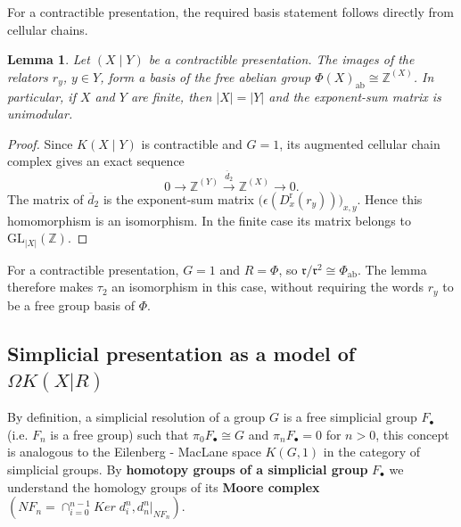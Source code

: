 \documentclass[11pt,a4paper]{article}
\newtheorem{lemma}[theorem]{Lemma}
\begin{document}
For a contractible presentation, the required basis statement follows
directly from cellular chains.
\begin{lemma}\label{l.1.3}
Let $(X\mid Y)$ be a contractible presentation.  The images of the relators
$r_y$, $y\in Y$, form a basis of the free abelian group
$\Phi(X)_{\mathrm{ab}}\cong\mathbb Z^{(X)}$.  In particular, if $X$ and $Y$
are finite, then $|X|=|Y|$ and the exponent-sum matrix is unimodular.
\end{lemma}
\begin{proof}
Since $K(X\mid Y)$ is contractible and $G=1$, its augmented cellular chain
complex gives an exact sequence
\[
 0\longrightarrow\mathbb Z^{(Y)}\xrightarrow{\,\overline d_2\,}
 \mathbb Z^{(X)}\longrightarrow0.
\]
The matrix of $\overline d_2$ is the exponent-sum matrix
$\bigl(\epsilon(D_x^{\mathrm r}(r_y))\bigr)_{x,y}$.  Hence this homomorphism is an isomorphism.  In the finite case its matrix belongs to
$\mathrm{GL}_{|X|}(\mathbb Z)$.
\end{proof}
For a contractible presentation, $G=1$ and $R=\Phi$, so
$\mathfrak r/\mathfrak r^2\cong\Phi_{\mathrm{ab}}$.
The lemma therefore makes $\tau_2$ an isomorphism in this case,
without requiring the words $r_y$ to be a free group basis of $\Phi$.
\subsection{Simplicial presentation as a model of $\Omega K(X|R)$}\label{r1.1}
By definition, a simplicial resolution of a group $ G $ is a free simplicial group $F_{\bullet}$ (i.e. $F_n$ is a free group) such that $\pi_0F_{\bullet}\cong G$ and $\pi_nF_{\bullet}=0$ for $n>0$, this concept is analogous to the Eilenberg - MacLane space $ K (G, 1) $ in the category of simplicial groups. By \textbf{homotopy groups of a simplicial group} $F_{\bullet}$ we understand the homology groups of its \textbf{Moore complex} $(NF_n=\cap^{n-1}_{i=0}Ker\;d_i^n, d_n^n|_{NF_n})$.
\end{document}
